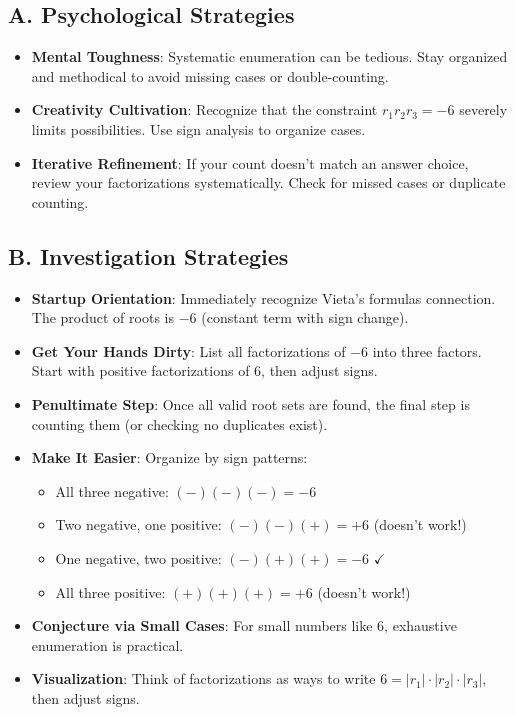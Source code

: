 \documentclass[12pt]{article}
\begin{document}
\begin{strategicbox}
\subsection*{A. Psychological Strategies}
\begin{itemize}[leftmargin=*]
    \item \textbf{Mental Toughness}: Systematic enumeration can be tedious. Stay organized and methodical to avoid missing cases or double-counting.
    \item \textbf{Creativity Cultivation}: Recognize that the constraint $r_1 r_2 r_3 = -6$ severely limits possibilities. Use sign analysis to organize cases.
    \item \textbf{Iterative Refinement}: If your count doesn't match an answer choice, review your factorizations systematically. Check for missed cases or duplicate counting.
\end{itemize}

\subsection*{B. Investigation Strategies}
\begin{itemize}[leftmargin=*]
    \item \textbf{Startup Orientation}: Immediately recognize Vieta's formulas connection. The product of roots is $-6$ (constant term with sign change).
    \item \textbf{Get Your Hands Dirty}: List all factorizations of $-6$ into three factors. Start with positive factorizations of 6, then adjust signs.
    \item \textbf{Penultimate Step}: Once all valid root sets are found, the final step is counting them (or checking no duplicates exist).
    \item \textbf{Make It Easier}: Organize by sign patterns:
    \begin{itemize}
        \item All three negative: $(-)(-)(-) = -6$
        \item Two negative, one positive: $(-)(-)(+) = +6$ (doesn't work!)
        \item One negative, two positive: $(-)(+)(+) = -6$ $\checkmark$
        \item All three positive: $(+)(+)(+) = +6$ (doesn't work!)
    \end{itemize}
    \item \textbf{Conjecture via Small Cases}: For small numbers like 6, exhaustive enumeration is practical.
    \item \textbf{Visualization}: Think of factorizations as ways to write $6 = |r_1| \cdot |r_2| \cdot |r_3|$, then adjust signs.
\end{itemize}


\end{strategicbox}
\end{document}
